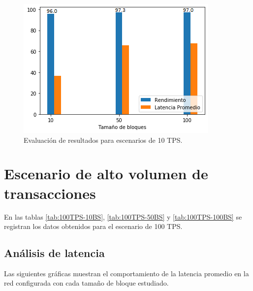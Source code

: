 \begin{figure}[h]
\centering
\includegraphics[scale=0.7]{Graphics/Resultado10TPS.png}
\caption{Evaluaci\'on de resultados para escenarios de 10 TPS.}
\label{Resultado10TPS}
\end{figure}

\newpage

\section{Escenario de alto volumen de transacciones}

En las tablas \ref{tab:100TPS-10BS}, \ref{tab:100TPS-50BS} y \ref{tab:100TPS-100BS} se registran los datos obtenidos para el escenario de 100 TPS.\\

\subsection{An\'alisis de latencia}

Las siguientes gr\'aficas muestran el comportamiento de la latencia promedio en la red configurada con cada tama\~no de bloque estudiado.\\


